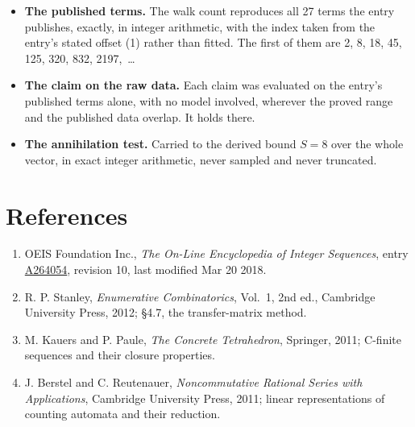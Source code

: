 \documentclass[11pt]{article}
\theoremstyle{definition}
\begin{document}
\begin{itemize}

\item {\bfseries The published terms.} The walk count reproduces all 27 terms the entry publishes, exactly, in integer arithmetic, with the index taken from the entry's stated offset (1) rather than fitted. The first of them are 2, 8, 18, 45, 125, 320, 832, 2197,~\dots

\item {\bfseries The claim on the raw data.} Each claim was evaluated on the entry's published terms alone, with no model involved, wherever the proved range and the published data overlap. It holds there.

\item {\bfseries The annihilation test.} Carried to the derived bound $S = 8$ over the whole vector, in exact integer arithmetic, never sampled and never truncated.

\end{itemize}

\section{References}

\begin{enumerate}

\item OEIS Foundation Inc., \emph{The On-Line Encyclopedia of Integer Sequences}, entry \href{https://oeis.org/A264054}{A264054}, revision 10, last modified Mar 20 2018.

\item R. P. Stanley, \emph{Enumerative Combinatorics}, Vol.~1, 2nd ed., Cambridge University Press, 2012; \S4.7, the transfer-matrix method.

\item M. Kauers and P. Paule, \emph{The Concrete Tetrahedron}, Springer, 2011; C-finite sequences and their closure properties.

\item J. Berstel and C. Reutenauer, \emph{Noncommutative Rational Series with Applications}, Cambridge University Press, 2011; linear representations of counting automata and their reduction.

\end{enumerate}
\end{document}
